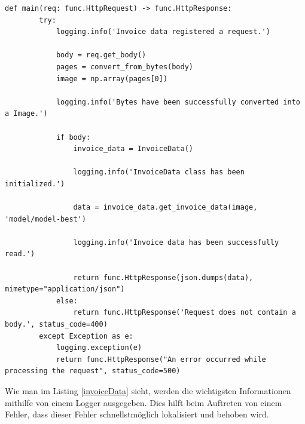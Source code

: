 \begin{minipage}{\linewidth}
\begin{lstlisting}[caption={Invoice Data Azure Function}, label={invoiceData}]
    def main(req: func.HttpRequest) -> func.HttpResponse:
        try:
            logging.info('Invoice data registered a request.')
            
            body = req.get_body()
            pages = convert_from_bytes(body)
            image = np.array(pages[0])

            logging.info('Bytes have been successfully converted into a Image.')

            if body:
                invoice_data = InvoiceData()

                logging.info('InvoiceData class has been initialized.')

                data = invoice_data.get_invoice_data(image, 'model/model-best')

                logging.info('Invoice data has been successfully read.')

                return func.HttpResponse(json.dumps(data), mimetype="application/json")
            else:
                return func.HttpResponse('Request does not contain a body.', status_code=400)
        except Exception as e:
            logging.exception(e)
            return func.HttpResponse("An error occurred while processing the request", status_code=500)
\end{lstlisting}
\end{minipage}

Wie man im Listing \ref{invoiceData} sieht, werden die wichtigsten Informationen mithilfe von einem Logger ausgegeben. Dies hilft beim Auftreten von einem Fehler, dass dieser Fehler schnellstmöglich lokalisiert und behoben wird.
